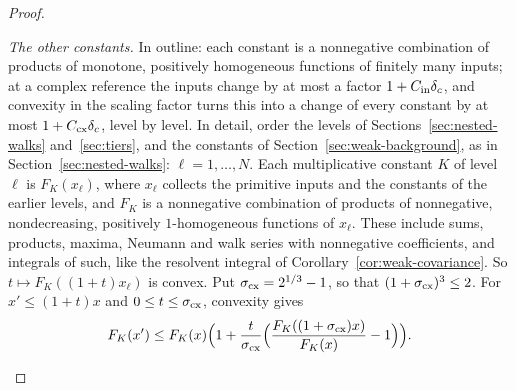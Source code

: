 \begin{proof}
\begin{enumerate}[label=(\roman*)]
  \emph{The other constants.} In outline: each constant is a nonnegative combination of products of monotone, positively homogeneous functions of finitely many inputs; at a complex reference the inputs change by at most a factor $1+C_{\rm in}\delta_c$, and convexity in the scaling factor turns this into a change of every constant by at most $1+C_{\rm cx}\delta_c$, level by level. In detail, order the levels of Sections~\ref{sec:nested-walks} and~\ref{sec:tiers}, and the constants of Section~\ref{sec:weak-background}, as in Section~\ref{sec:nested-walks}: $\ell=1,\dots,N$. Each multiplicative constant $K$ of level $\ell$ is $F_K(x_\ell)$, where $x_\ell$ collects the primitive inputs and the constants of the earlier levels, and $F_K$ is a nonnegative combination of products of nonnegative, nondecreasing, positively $1$-homogeneous functions of $x_\ell$. These include sums, products, maxima, Neumann and walk series with nonnegative coefficients, and integrals of such, like the resolvent integral of Corollary~\ref{cor:weak-covariance}. So $t\mapsto F_K((1+t)x_\ell)$ is convex. Put $\sigma_{\rm cx}=2^{1/3}-1$, so that $(1+\sigma_{\rm cx})^3\le2$. For $x'\le(1+t)x$ and $0\le t\le\sigma_{\rm cx}$, convexity gives
  \[
  F_K(x')\le F_K(x)\Big(1+\frac t{\sigma_{\rm cx}}\Big(\frac{F_K((1+\sigma_{\rm cx})x)}{F_K(x)}-1\Big)\Big).
  \]

\end{enumerate}
\end{proof}
